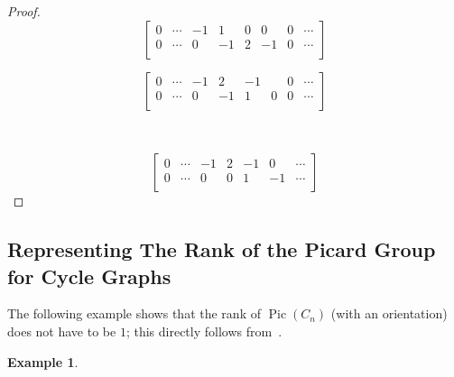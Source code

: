 \documentclass[11pt,reqno]{amsart}
\DeclareMathOperator{\Pic}{Pic}
\theoremstyle{definition}
\newtheorem{myeg}[mydef]{\textbf{Example}}
\theoremstyle{plain}
\begin{document}
\begin{proof}
			\noindent\begin{minipage}{.5\linewidth}
				\begin{equation}
					\left[\begin{array}{cccccccc}
						0 & \cdots & -1 & 1 & 0 & 0 & 0 & \cdots \\
						0 & \cdots & 0 & -1 & 2 & -1 & 0 & \cdots \\
					\end{array}\right]
				\end{equation}
			\end{minipage}
			\begin{minipage}{.5\linewidth}
				\begin{equation}
					\left[\begin{array}{cccccccc}
						0 & \cdots & -1 & 2 & -1 & & 0 & \cdots \\
						0 & \cdots & 0 & -1 & 1 & 0 & 0 & \cdots \\
					\end{array}\right]
				\end{equation}
			\end{minipage}

			\\\noindent\begin{minipage}{.5\linewidth}
				\begin{equation}
				  	\left[\begin{array}{cccccccc}
						0 & \cdots & -1 & 2 & -1 & 0 & \cdots \\
						0 & \cdots & 0 & 0 & 1 & -1 & \cdots \\
					\end{array}\right]
				\end{equation}
			\end{minipage}

		\end{proof}

	\subsection{Representing The Rank of the Picard Group for Cycle Graphs}
		The following example shows that the rank of $\Pic(C_n)$ (with an orientation) does not have to be $1$;
		this directly follows from~\cite[Corollary 3.5]{wagner2000critical}.

		\begin{myeg}
		\end{myeg}
\end{document}
